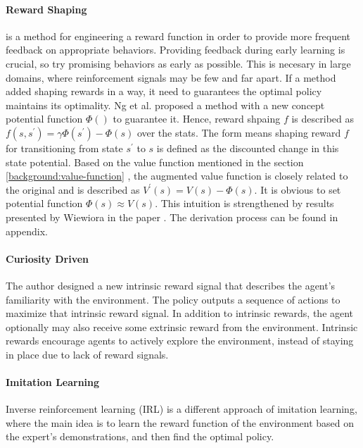 \paragraph{Reward Shaping\parencite{Wiewiora2010}} is a method for engineering a reward function in order to provide more frequent feedback on appropriate behaviors. Providing feedback during early learning is crucial, so try promising behaviors as early as possible. This is necesary in large domains, where reinforcement signals may be few and far apart. If a method added shaping rewards in a way, it need to guarantees the optimal policy maintains its optimality. Ng et al. proposed a method with a new concept potential function $\Phi()$ to guarantee it. Hence, reward shpaing $f$ is described as $f(s, s^{\prime}) = \gamma\Phi(s^{\prime}) - \Phi(s)$ over the stats\parencite{Ng1999PolicyIU}. The form means shaping reward $f$ for transitioning from state $s^{\prime}$ to $s$ is defined as the discounted change in this state potential. Based on the value function mentioned in the section \ref{background:value-function} , the augmented value function is closely related to the original and is described as $V^{\prime}(s) = V(s) - \Phi(s)$. It is obvious to set potential function $\Phi(s) \approx V(s)$. This intuition is strengthened by results presented by Wiewiora in the paper \parencite{Wiewiora2003}. The derivation process can be found in appendix.

 
\paragraph{Curiosity Driven \parencite{pathakICMl17curiosity}} The author designed a new intrinsic reward signal that describes the agent’s familiarity with the environment. The policy outputs a sequence of actions to maximize that intrinsic reward signal. In addition to intrinsic rewards, the agent optionally may also receive some extrinsic reward from the environment. Intrinsic rewards encourage agents to actively explore the environment, instead of staying in place due to lack of reward signals.

\paragraph{Imitation Learning\parencite{DBLP:journals/corr/HesterVPLSPSDOA17}} Inverse reinforcement learning (IRL) is a different approach of imitation learning, where the main idea is to learn the reward function of the environment based on the expert’s demonstrations, and then find the optimal policy.

